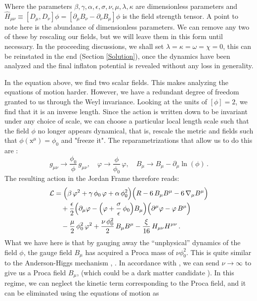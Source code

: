 \documentclass[aps,prd,reprint,preprintnumbers,showpacs,floatfix,nofootinbib,superscript address]{revtex4-2}
\begin{document}
Where the parameters ${\beta, \gamma, \alpha, \epsilon, \sigma, \nu, \mu, \lambda, \kappa}$ are dimensionless parameters and $\hat{H}_{\mu\nu} \equiv [D_\mu,D_\nu]\phi = [\partial_\mu B_\nu - \partial_\nu B_\mu]\phi$ is the field strength tensor. A point to note here is the abundance of dimensionless parameters. We can remove any two of these by rescaling our fields, but we will leave them in this form until necessary. In the proceeding discussions, we shall set $\lambda = \kappa = \omega = \chi= 0$, this can be reinstated in the end (Section \ref{Solution}), once the dynamics have been analyzed and the final inflaton potential is revealed without any loss in generality.

In the equation above, we find two scalar fields. This makes analyzing the equations of motion harder. However, we have a redundant degree of freedom granted to us through the Weyl invariance. Looking at the units of $[\phi] = 2$, we find that it is an inverse length. Since the action is written down to be invariant under any choice of scale, we can choose a particular local length scale such that the field $\phi$ no longer appears dynamical, that is, rescale the metric and fields such that $\phi(\text{x}^\mu) = \phi_0$ and "freeze it". The reparametrizations that allow us to do this are :
\[
g_{\mu \nu}\rightarrow\frac{\phi_0}{\phi}\,g_{\mu \nu},\quad 
\varphi\rightarrow\frac{\phi}{\phi_0}\,\varphi,\quad 
B_{\mu}\rightarrow B_{\mu} - \partial_{\mu}\ln(\phi)\,.
\] 
The resulting action in the Jordan Frame therefore reads:
\begin{equation}\label{29}
\begin{aligned}
\mathcal{L} &= \Bigl(\beta\, \varphi^2 + \gamma\, \phi_0\, \varphi + \alpha\, \phi_0^2\Bigr)
\Bigl(R - 6\, B_{\mu} B^{\mu} - 6\, \nabla_{\mu} B^\mu\Bigr) \\
&\quad + \frac{\epsilon}{2} \Bigl(\partial_{\mu}\varphi - \Bigl(\varphi + \frac{\sigma}{\epsilon}\,\phi_0\Bigr)B_{\mu}\Bigr)
\Bigl(\partial^{\mu}\varphi - \varphi\,B^{\mu}\Bigr) \\
&\quad - \frac{\mu}{2}\, \phi_0^2\,\varphi^2 
+ \frac{\nu\,\phi_0^2}{2}\,B_{\mu} B^{\mu} 
- \frac{\xi}{16}\,H_{\mu\nu} H^{\mu\nu}\,.
\end{aligned}
\end{equation}
What we have here is that by gauging away the ``unphysical'' dynamics of the field $\phi$, the gauge field $B_\mu$ has acquired a Proca mass of $\nu \phi_0^2$. This is quite similar to the Anderson-Higgs mechanism \cite{anderson_plasmons_1963}, \cite{higgs_broken_1964}. In accordance with \cite{barker2024poincaregaugetheoryconformal}, we can send $\nu \rightarrow \infty$ to give us a Proca field $B_\mu$, (which could be a dark matter candidate \cite{Lasenby_2016}). In this regime, we can neglect the kinetic term corresponding to the Proca field, and it can be eliminated using the equations of motion as
\end{document}
